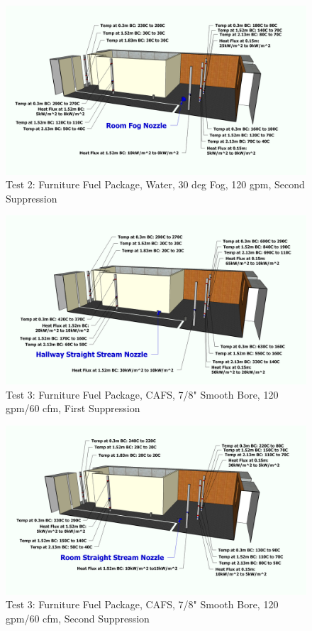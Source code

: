\documentclass[12pt,oneside]{book}
\begin{document}
\begin{figure}[!ht]
	\includegraphics[width=6in]{../Figures/Pictures/Metric/DelCoFogTest2SecondSuppression}
	\caption{Test 2: Furniture Fuel Package, Water, 30 deg Fog, 120 gpm, Second Suppression}
	\label{fig:Test_2_Second_Suppression}
\end{figure}

\clearpage

\begin{figure}[!ht]
	\includegraphics[width=6in]{../Figures/Pictures/Metric/DelCoSSTest3FirstSuppression}
	\caption{Test 3: Furniture Fuel Package, CAFS, 7/8" Smooth Bore, 120 gpm/60 cfm, First Suppression}
	\label{fig:Test_3_First_Suppression}
\end{figure}

\begin{figure}[!ht]
	\includegraphics[width=6in]{../Figures/Pictures/Metric/DelCoSSTest3SecondSuppression}
	\caption{Test 3: Furniture Fuel Package, CAFS, 7/8" Smooth Bore, 120 gpm/60 cfm, Second Suppression}
	\label{fig:Test_3_Second_Suppression}
\end{figure}
\end{document}
